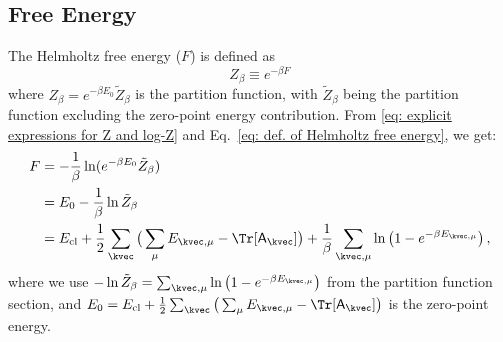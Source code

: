 \subsection{Free Energy}\label{subsec: Free Energy}
The Helmholtz free energy ($F$) is defined as 
\begin{equation}\label{eq: def. of Helmholtz free energy}
    Z_{\beta} \equiv e^{-\beta F}
\end{equation}
where $Z_{\beta} = e^{- \beta E_0} \tilde{Z}_{\beta}$ is the partition function, with $\tilde{Z}_{\beta}$ being the partition function excluding the zero-point energy contribution.
From \eqref{eq: explicit expressions for Z and log-Z} and Eq.~\eqref{eq: def. of Helmholtz free energy}, we get:
\begin{align}
    F &= -\frac{1}{\beta} \ln(e^{- \beta E_0} \tilde{Z}_{\beta}) \nonumber \\
    &= E_0 - \frac{1}{\beta} \ln \tilde{Z}_{\beta} \nonumber \\
    &= E_{\rm cl} + \frac{1}{2} \sum_{\kvec} \big( \sum_{\mu} E_{\kvec, \mu} - \Tr [\mathsf{A}_{\kvec}] \big) + \frac{1}{\beta} \sum_{\kvec, \mu} \ln \left( 1 - e^{-\beta E_{\kvec, \mu}} \right),
\end{align}
where we use $-\ln \tilde{Z}_{\beta} = \sum_{\kvec, \mu} \ln \left( 1 - e^{-\beta E_{\kvec, \mu}} \right)$ from the partition function section, and $E_0 = E_{\rm cl} + \frac{1}{2} \sum_{\kvec} \big( \sum_{\mu} E_{\kvec, \mu} - \Tr [\mathsf{A}_{\kvec}] \big)$ is the zero-point energy.


